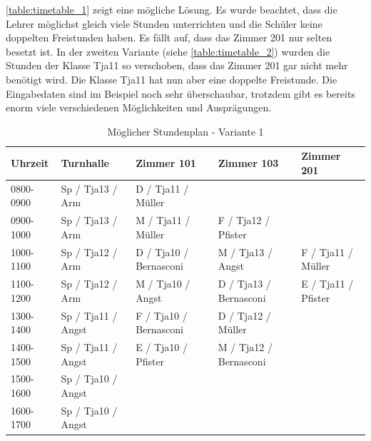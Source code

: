 \FloatBarrier
\autoref{table:timetable_1} zeigt eine mögliche Lösung. Es wurde beachtet, dass die Lehrer möglichst gleich viele Stunden unterrichten und die Schüler keine doppelten Freistunden haben. Es 
fällt auf, dass das Zimmer 201 nur selten besetzt ist. In der zweiten Variante (siehe \autoref{table:timetable_2}) wurden die Stunden der Klasse Tja11 so verschoben, dass 
das Zimmer 201 gar nicht mehr benötigt wird. Die Klasse Tja11 hat nun aber eine doppelte Freistunde. Die Eingabedaten sind im Beispiel noch sehr überschaubar, 
trotzdem gibt es bereits enorm viele verschiedenen Möglichkeiten und Ausprägungen.

\begin{table}[ht]
\centering
  \begin{tabular}{ l | l | l | l | l }
	\hline
	\rowcolor{gray}
	\textbf{Uhrzeit} 	& \textbf{Turnhalle}	& \textbf{Zimmer 101} 	& \textbf{Zimmer 103}	&  \textbf{Zimmer 201}\\ \hline
	0800-0900		& Sp / Tja13 / Arm		& D / Tja11 / Müller		& 				& \\ \hline
	0900-1000		& Sp / Tja13 / Arm		& M / Tja11 / Müller		& F / Tja12 / Pfister		& \\ \hline
	1000-1100		& Sp / Tja12 / Arm		& D / Tja10 / Bernasconi	& M / Tja13 / Angst		& F / Tja11 / Müller\\ \hline
	1100-1200		& Sp / Tja12 / Arm		& M / Tja10 / Angst		& D / Tja13 / Bernasconi	& E / Tja11 / Pfister\\ \hline \hline
	1300-1400		& Sp / Tja11 / Angst	& F / Tja10 / Bernasconi	& D / Tja12 / Müller		& \\ \hline
	1400-1500		& Sp / Tja11 / Angst	& E / Tja10 / Pfister		& M / Tja12 / Bernasconi	& \\ \hline
	1500-1600		& Sp / Tja10 / Angst	& 				& 				& \\ \hline
	1600-1700		& Sp / Tja10 / Angst	& 				& 				& \\ \hline
  \end{tabular}
   \caption{Möglicher Stundenplan - Variante 1}\label{table:timetable_1}
\end{table}

